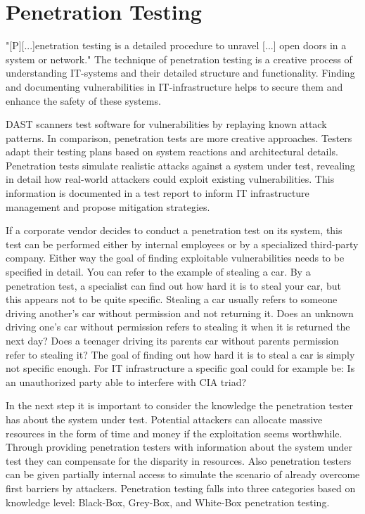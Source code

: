 \chapter{Penetration Testing}
\label{ch:chapter04}
"[P][...]enetration testing is a detailed procedure to unravel [...] open doors in a system or network." \cite{Lachkov_2022} The technique of penetration testing is a creative process of understanding IT-systems and their detailed structure and functionality. Finding and documenting vulnerabilities in IT-infrastructure helps to secure them and enhance the safety of these systems.

\ac{DAST} scanners test software for vulnerabilities by replaying known attack patterns. In comparison, penetration tests are more creative approaches. Testers adapt their testing plans based on system reactions and architectural details. Penetration tests simulate realistic attacks against a system under test, revealing in detail how real-world attackers could exploit existing vulnerabilities. This information is documented in a test report to inform IT infrastructure management and propose mitigation strategies. \cite{Lachkov_2022}

If a corporate vendor decides to conduct a penetration test on its system, this test can be performed either by internal employees or by a specialized third-party company. Either way the goal of finding exploitable vulnerabilities needs to be specified in detail. You can refer to the example of stealing a car. By a penetration test, a specialist can find out how hard it is to steal your car, but this appears not to be quite specific. Stealing a car usually refers to someone driving another's car without permission and not returning it. Does an unknown driving one's car without permission refers to stealing it when it is returned the next day? Does a teenager driving its parents car without parents permission refer to stealing it? The goal of finding out how hard it is to steal a car is simply not specific enough. For IT infrastructure a specific goal could for example be: Is an unauthorized party able to interfere with \ac{CIA} triad? \cite{Bishop_2007}

In the next step it is important to consider the knowledge the penetration tester has about the system under test. Potential attackers can allocate massive resources in the form of time and money if the exploitation seems worthwhile. Through providing penetration testers with information about the system under test they can compensate for the disparity in resources. \cite{Bishop_2007} Also penetration testers can be given partially internal access to simulate the scenario of already overcome first barriers by attackers. \cite{Bishop_2007} Penetration testing falls into three categories based on knowledge level: Black-Box, Grey-Box, and White-Box penetration testing. \cite{Rane_2024}

